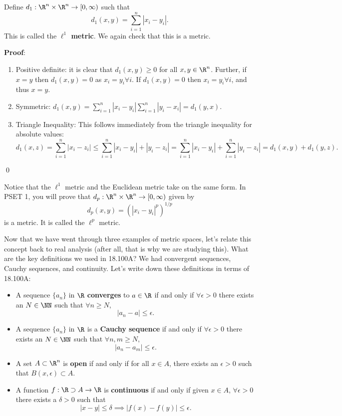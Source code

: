 \begin{example}
Define $d_1:\R^n \times \R^n \to [0,\infty)$ such that 
\[
d_1(x,y) = \sum_{i=1}^n |x_i-y_i|.
\]
This is called the \textbf{$\ell^1$ metric}. We again check that this is a metric.
\end{example}
\textbf{Proof}:
\begin{enumerate}
    \item Positive definite: it is clear that $d_1(x,y) \geq 0$ for all $x,y\in \R^n$. Further, if $x=y$ then $d_1(x,y) = 0$ as $x_i = y_i\forall i$. If $d_1(x,y) = 0$ then $x_i = y_i \forall i$, and thus $x=y$.
    \item Symmetric: $d_1(x,y) = \sum_{i=1}^n |x_i-y_i| \sum_{i=1}^n |y_i-x_i| = d_1(y,x)$.
    \item Triangle Inequality: This follows immediately from the triangle inequality for absolute values:
    \[
    d_1(x,z) = \sum_{i=1}^n |x_i-z_i| \leq \sum_{i=1}^n |x_i-y_i| + |y_i - z_i|= \sum_{i=1}^n |x_i-y_i| + \sum_{i=1}^n|y_i - z_i| = d_1(x,y) + d_1(y,z).
    \]
\end{enumerate}
\qed 

\begin{remark}
Notice that the $\ell^1$ metric and the Euclidean metric take on the same form. In PSET 1, you will prove that $d_p:\R^n \times \R^n \to [0,\infty)$ given by 
\[
d_p(x,y) = \left(|x_i-y_i|^p \right)^{1/p}
\]
is a metric. It is called the $\ell^p$ metric.
\end{remark}

Now that we have went through three examples of metric spaces, let's relate this concept back to real analysis (after all, that is why we are studying this). What are the key definitions we used in 18.100A? We had convergent sequences, Cauchy sequences, and continuity. Let's write down these definitions in terms of 18.100A:

\begin{itemize}
    \item A sequence $\{a_n\}$ in $\R$ \textbf{converges} to $a\in \R$ if and only if $\forall \epsilon>0$ there exists an $N\in \NN$ such that $\forall n \geq N$, 
    \[
        |a_n - a| \leq \epsilon.
    \]
    \item A sequence $\{a_n\}$ in $\R$ is a \textbf{Cauchy sequence} if and only if $\forall \epsilon>0$ there exists an $N\in \NN$ such that $\forall n,m \geq N$, 
    \[
        |a_n - a_m| \leq \epsilon.
    \]
    \item A set $A \subset \R^n$ is \textbf{open} if and only if for all $x\in A$, there exists an $\epsilon >0$ such that $B(x,\epsilon) \subset A$.
    \item A function $f:\R \supset A \to \R$ is \textbf{continuous} if and only if given $x\in A$, $\forall \epsilon >0$ there exists a $\delta >0$ such that 
    \[
        |x-y| \leq \delta\implies |f(x) - f(y)| \leq \epsilon.
    \]
\end{itemize}

